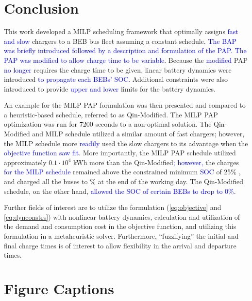\documentclass[utf8]{FrontiersinHarvard}
\newcommand{\bcharge}{0.7 }                                                     %
\newcommand{\mincharge}{25\% }                                                  %
\newcommand{\timeran}{7200 }                                                    %
\begin{document}
\section{Conclusion}
\label{sec:conclusion}
This work developed a MILP scheduling framework that optimally assigns \textcolor{blue}{fast and slow}
chargers to a BEB bus fleet assuming a constant schedule. \textcolor{blue}{The BAP was briefly introduced followed by a description and formulation of the PAP.} \textcolor{blue}{The PAP was modified to allow charge time to be variable}. Because the \textcolor{blue}{modified} PAP \textcolor{blue}{no longer}
requires the charge time to be given, linear battery dynamics were introduced \textcolor{blue}{to propagate each BEBs' SOC.} Additional constraints were also introduced to provide \textcolor{blue}{upper and lower}
limits for the battery dynamics.

An example for the MILP PAP formulation was then presented and compared to a heuristic-based schedule, referred to as
Qin-Modified. The MILP PAP optimization was run for \timeran seconds to a non-optimal solution. The Qin-Modified and
MILP schedule utilized a similar amount of fast chargers; however, the MILP schedule more
\textcolor{blue}{readily} used the slow chargers to its advantage when the
\textcolor{blue}{objective function saw fit}. More importantly, the MILP PAP schedule utilized approximately
\(0.1\cdot10^4\) kWh more than the Qin-Modified\textcolor{blue}{; however,} the charges \textcolor{blue}{for the MILP schedule} remained above the constrained minimum \textcolor{blue}{SOC} of \mincharge, and charged all
the buses to \fpeval{\bcharge *100}\% at the end of the working day. The Qin-Modified schedule, on the other hand,
\textcolor{blue}{allowed the SOC of certain BEBs to drop to 0\%}.

Further fields of interest are to utilize the formulation (\autoref{eq:objective} and \autoref{eq:dynconstrs}) with
nonlinear battery dynamics, calculation and utilization of the demand and consumption cost in the objective function,
and utilizing this formulation in a metaheuristic solver. Furthermore, ``fuzzifying'' the initial and final charge times
is of interest to allow flexibility in the arrival and departure times.




\nolinenumbers
\clearpage

\section{Figure Captions}
\label{sec:org5054b47}
\end{document}
